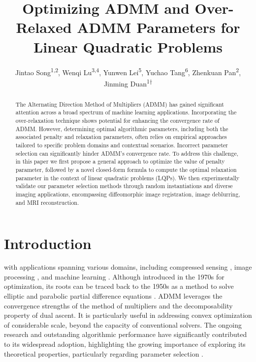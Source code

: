 \documentclass[letterpaper]{article} %
\title{Optimizing ADMM and Over-Relaxed ADMM  Parameters for \\Linear Quadratic Problems}
\author{
   Jintao Song\textsuperscript{\rm 1,\rm2}, Wenqi Lu\textsuperscript{\rm3,\rm4}, Yunwen Lei\textsuperscript{\rm 5}, Yuchao Tang\textsuperscript{\rm 6}, Zhenkuan Pan\textsuperscript{\rm 2}, Jinming Duan\textsuperscript{\rm 1{$\dagger$}}\\
  }
\begin{document}
\maketitle

\begin{abstract}
The Alternating Direction Method of Multipliers (ADMM) has gained significant attention across a broad spectrum of machine learning applications. Incorporating the over-relaxation technique shows potential for enhancing the convergence rate of ADMM. However, determining optimal algorithmic parameters, including both the associated penalty and relaxation parameters, often relies on empirical approaches tailored to specific problem domains and contextual scenarios. Incorrect parameter selection can significantly hinder ADMM's convergence rate. To address this challenge, in this paper we first propose a general approach to optimize the value of penalty parameter, followed by a novel closed-form formula to compute the optimal relaxation parameter in the context of linear quadratic problems (LQPs). We then experimentally validate our parameter selection methods through random instantiations and diverse imaging applications, encompassing diffeomorphic image registration, image deblurring, and MRI reconstruction.
\end{abstract}

\section{Introduction}

 with applications spanning various domains, including compressed sensing \cite{hou2022truncated,liu2023distributed}, image processing \cite{chan2016plug,yazaki2019interpolation}, and machine learning \cite{li2022robust,zhou2023federated}. Although introduced in the 1970s for optimization, its roots can be traced back to the 1950s as a method to solve elliptic and parabolic partial difference equations \cite{boyd2011distributed}. ADMM leverages the convergence strengths of the method of multipliers and the decomposability property of dual ascent. It is particularly useful in addressing convex optimization of considerable scale, beyond the capacity of conventional solvers. The ongoing research and outstanding algorithmic performance have significantly contributed to its widespread adoption, highlighting the growing importance of exploring its theoretical properties, particularly regarding parameter selection \cite{ghadimi2014optimal,wang2019admm}.
\end{document}
